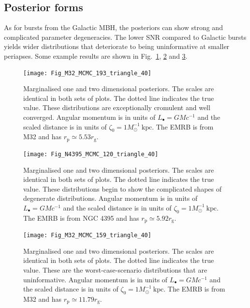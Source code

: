 \documentclass[useAMS,usedcolumn,usegraphicx,usenatbib]{mn2e}
\newcommand{\figref}[1]{Fig.~\ref{fig:#1}}
\newcommand{\units}[1]{\ensuremath{~\mathrm{#1}}}
\newcommand{\sub}[1]{\ensuremath{_\mathrm{#1}}}
\begin{document}
\subsection{Posterior forms}

As for bursts from the Galactic MBH, the posteriors can show strong and complicated parameter degeneracies. The lower SNR compared to Galactic bursts yields wider distributions that deteriorate to being uninformative at smaller periapses. Some example results are shown in \figref{MCMC-a}, \ref{fig:MCMC-b} and \ref{fig:MCMC-c}.
\begin{figure}
\begin{center}
   \texttt{[image: Fig\_M32\_MCMC\_193\_triangle\_40]}
\caption{Marginalised one and two dimensional posteriors. The scales are identical in both sets of plots. The dotted line indicates the true value. These distributions are exceptionally cromulent and well converged. Angular momentum is in units of $L_\bullet = GM c^{-1}$ and the scaled distance is in units of $\zeta_0 = 1 M_\odot^{-1}\units{kpc}$. The EMRB is from M32 and has $r\sub{p} \simeq 5.53 r\sub{g}$.\label{fig:MCMC-a}}
\end{center}
\end{figure}

\begin{figure}
\begin{center}
   \texttt{[image: Fig\_N4395\_MCMC\_120\_triangle\_40]}
\caption{Marginalised one and two dimensional posteriors. The scales are identical in both sets of plots. The dotted line indicates the true value. These distributions begin to show the complicated shapes of degenerate distributions. Angular momentum is in units of $L_\bullet = GM c^{-1}$ and the scaled distance is in units of $\zeta_0 = 1 M_\odot^{-1}\units{kpc}$. The EMRB is from NGC 4395 and has $r\sub{p} \simeq 5.92 r\sub{g}$.\label{fig:MCMC-b}}
\end{center}
\end{figure}

\begin{figure}
\begin{center}
   \texttt{[image: Fig\_M32\_MCMC\_159\_triangle\_40]}
\caption{Marginalised one and two dimensional posteriors. The scales are identical in both sets of plots. The dotted line indicates the true value. These are the worst-case-scenario distributions that are uninformative. Angular momentum is in units of $L_\bullet = GM c^{-1}$ and the scaled distance is in units of $\zeta_0 = 1 M_\odot^{-1}\units{kpc}$. The EMRB is from M32 and has $r\sub{p} \simeq 11.79 r\sub{g}$.}
\label{fig:MCMC-c}
\end{center}
\end{figure}
\end{document}
